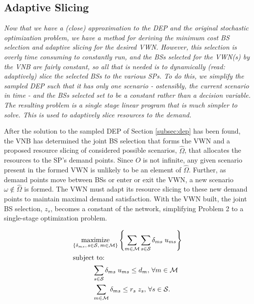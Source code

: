 \documentclass[12pt,dvips]{report}
\begin{document}
\subsection{Adaptive Slicing} \label{subsec:dep_slicing}

\textit{Now that we have a (close) approximation to the DEP and the original stochastic optimization problem, we have a method for deriving the minimum cost BS selection and adaptive slicing for the desired VWN.  However, this selection is overly time consuming to constantly run, and the BSs selected for the VWN(s) by the VNB are fairly constant, so all that is needed is to dynamically (read: adaptively) slice the selected BSs to the various SPs.  To do this, we simplify the sampled DEP such that it has only one scenario - ostensibly, the current scenario in time - and the BSs selected set to be a constant rather than a decision variable.  The resulting problem is a single stage linear program that is much simpler to solve.  This is used to adaptively slice resources to the demand.}

After the solution to the sampled DEP of Section \ref{subsec:dep} has been found, the VNB has determined the joint BS selection that forms the VWN and a proposed resource slicing of considered possible scenarios, $\hat{\Omega}$, that allocates the resources to the SP's demand points.  Since $O$ is not infinite, any given scenario present in the formed VWN is unlikely to be an element of $\hat{\Omega}$.  Further, as demand points move between BSs or enter or exit the VWN, a new scenario $\omega \notin \hat{\Omega}$ is formed.  The VWN must adapt its resource slicing to these new demand points to maintain maximal demand satisfaction.  With the VWN built, the joint BS selection, $z_s$, becomes a constant of the network, simplifying Problem 2 to a single-stage optimization problem.

\vspace{3mm}
\begin{tcolorbox}[title = Problem 3 (Deterministic Adaptive Slicing)]
\begin{align}
& \underset{\left\{ \substack{
	\delta_{ms},\,	s \in \mathcal{S},\, m \in \mathcal{M}} \right\}} {\text{maximize}}
\left\{ \sum_{m \in \mathcal{M}} \sum_{s \in \mathcal{S}} \delta_{ms} \; u_{ms} \right\} \label{eq:P3}\\
& \text{subject to:}  \nonumber \\
& \hspace{0.4in} \sum_{s \in \mathcal{S}} \delta_{ms} \; u_{ms} \leq d_m,\, \forall m \in \mathcal{M} \label{eq:P3C1}\\
& \hspace{0.4in} \sum_{m \in \mathcal{M}} \delta_{ms} \leq r_s \; z_s,\, \forall s \in \mathcal{S}. \label{eq:P3C2}
\end{align}
\end{tcolorbox}
\end{document}
